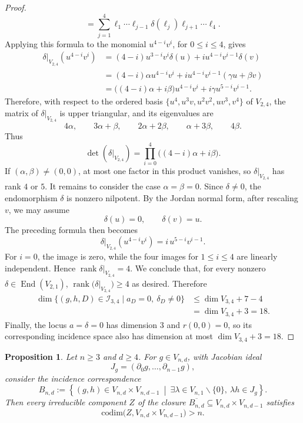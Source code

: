 \documentclass[a4paper,12pt,twoside,reqno]{amsart}
\numberwithin{equation}{section}
\theoremstyle{plain}
\newtheorem{proposition}[theorem]{Proposition}
\theoremstyle{definition}
\DeclareMathOperator{\rank}{rank}
\newcommand{\codim}{\mathrm{codim}}
\theoremstyle{plain}
\theoremstyle{definition}
\begin{document}
\begin{proof}
\[=
\sum_{j=1}^4
\ell_1\cdots\ell_{j-1}\delta(\ell_j)
\ell_{j+1}\cdots\ell_4.
\]
Applying this formula to the monomial \(u^{4-i}v^i\), for
\(0\le i\le4\), gives
\[
\begin{aligned}
\delta|_{V_{2,4}}(u^{4-i}v^i)
&=(4-i)u^{3-i}v^i\delta(u)
  +i u^{4-i}v^{i-1}\delta(v)\\
&=(4-i)\alpha u^{4-i}v^i
  +i u^{4-i}v^{i-1}(\gamma u+\beta v)\\
&=\bigl((4-i)\alpha+i\beta\bigr)u^{4-i}v^i
  +i\gamma u^{5-i}v^{i-1}.
\end{aligned}
\]
Therefore, with respect to the ordered basis $\{u^4, u^3v, u^2v^2, uv^3,v^4\}$ of $V_{2,4}$, the matrix of $\delta|_{V_{2,4}}$ is upper triangular, and its eigenvalues are
\[
4\alpha,\qquad
3\alpha+\beta,\qquad
2\alpha+2\beta,\qquad
\alpha+3\beta,\qquad
4\beta.
\]
Thus
\[
   \det(\delta|_{V_{2,4}})
   =\prod_{i=0}^4\bigl((4-i)\alpha+i\beta\bigr).
\]
If $(\alpha,\beta)\ne(0,0)$, at most one factor in this product vanishes, so $\delta|_{V_{2,4}}$ has rank $4$ or $5$. It remains to consider the case $
\alpha=\beta=0.$ Since \(\delta\neq0\), the endomorphism \(\delta\) is nonzero
nilpotent. By the Jordan normal form, after rescaling \(v\), we may
assume
\[
\delta(u)=0,
\qquad
\delta(v)=u.
\]
The preceding formula then becomes
\[
\delta|_{V_{2,4}}(u^{4-i}v^i)
=
i\,u^{5-i}v^{i-1}.
\]
For \(i=0\), the image is zero, while the four images for $1\le i\le4$ are linearly independent. Hence
$\rank\delta|_{V_{2,4}}=4$.  We conclude that, for every nonzero
\(\delta\in\operatorname{End}(V_{2,1})\), $\rank\bigl(\delta|_{V_{2,4}})\ge4$ as desired. Therefore
\begin{align*}
   \dim\{(g,h,D) \in \mathcal{I}_{3,4}\mid a_D=0,\ \delta_D\ne0\}
   &\le\dim V_{3,4}+7-4\\
   &=\dim V_{3,4}+3=18.
\end{align*}
Finally, the locus $a=\delta=0$ has dimension $3$ and $r(0,0)=0$, so its corresponding incidence space also has dimension at most $\dim V_{3,4}+3=18$.
\end{proof}

\begin{proposition}\label{prop:strata-two-parts}
Let \(n\ge3\) and \(d\ge4\). For \(g\in V_{n,d}\), with Jacobian ideal
\[
J_g=(\partial_0g,\dots,\partial_{n-1}g),
\]
consider the incidence correspondence
\[
B_{n,d}:=
\left\{(g,h) \in V_{n,d}\times V_{n,d-1}\ \middle|\
\exists\lambda\in V_{n,1}\smallsetminus\{0\},\
\lambda h\in J_g
\right\}.
\]
Then every irreducible component \(Z\) of the closure
\(\overline{B_{n,d}}\subseteq V_{n,d}\times V_{n,d-1}\) satisfies
\[
\codim\bigl(Z,V_{n,d}\times V_{n,d-1}\bigr)>n.
\]
\end{proposition}
\end{document}
